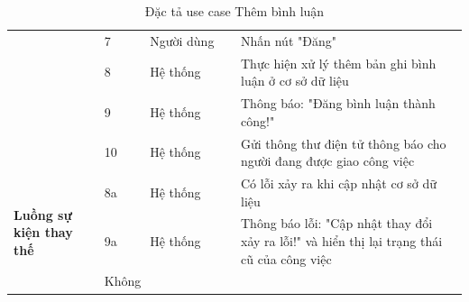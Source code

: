 \documentclass[../DoAn.tex]{subfiles}
\begin{document}
\begin{table}[ht]
\begin{tabular}{| p{0.2\linewidth} | p{0.1\linewidth} | p{0.2\linewidth} | p{0.5\linewidth} |}
                                                                     & \multicolumn{1}{p{0.1\linewidth}|}{7}                                                             & \multicolumn{1}{p{0.2\linewidth}|}{Người dùng}             & \multicolumn{1}{p{0.5\linewidth}|}{Nhấn nút "Đăng"}                                                                            \\ \cline{2-4}
                                                                     & \multicolumn{1}{p{0.1\linewidth}|}{8}                                                             & \multicolumn{1}{p{0.2\linewidth}|}{Hệ thống}               & \multicolumn{1}{p{0.5\linewidth}|}{Thực hiện xử lý thêm bản ghi bình luận ở cơ sở dữ liệu}                                     \\ \cline{2-4}
                                                                     & \multicolumn{1}{p{0.1\linewidth}|}{9}                                                             & \multicolumn{1}{p{0.2\linewidth}|}{Hệ thống}               & \multicolumn{1}{p{0.5\linewidth}|}{Thông báo: "Đăng bình luận thành công!"}                                                    \\ \cline{2-4}
                                                                     & \multicolumn{1}{p{0.1\linewidth}|}{10}                                                            & \multicolumn{1}{p{0.2\linewidth}|}{Hệ thống}               & \multicolumn{1}{p{0.5\linewidth}|}{Gửi thông thư điện tử thông báo cho người đang được giao công việc}                         \\ \hline

        \multirow{4}{\linewidth}{\textbf{Luồng sự kiện thay thế}}    & \multicolumn{1}{p{0.1\linewidth}|}{8a}                                                            & \multicolumn{1}{p{0.2\linewidth}|}{Hệ thống}               & \multicolumn{1}{p{0.5\linewidth}|}{Có lỗi xảy ra khi cập nhật cơ sở dữ liệu}                                                   \\ \cline{2-4}
                                                                     & \multicolumn{1}{p{0.1\linewidth}|}{9a}                                                            & \multicolumn{1}{p{0.2\linewidth}|}{Hệ thống}               & \multicolumn{1}{p{0.5\linewidth}|}{Thông báo lỗi: "Cập nhật thay đổi xảy ra lỗi!" và hiển thị lại trạng thái cũ của công việc} \\ \hline

        \textbf{Hậu điều kiện}                                       & \multicolumn{3}{p{0.1\linewidth}|}{Không}                                                                                                                                                                                                                                                       \\ \hline
    \end{tabular}%
    \renewcommand{\arraystretch}{1}
    \caption{Đặc tả use case Thêm bình luận}
    \label{tab:UC06}
\end{table}
\end{document}
